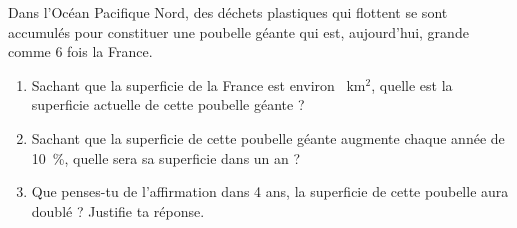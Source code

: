 
\medskip

Dans l'Océan Pacifique Nord, des déchets plastiques qui flottent se sont accumulés pour constituer une poubelle géante qui est, aujourd'hui, grande comme 6 fois la France.

\medskip
 
\begin{enumerate}
\item Sachant que la superficie de la France est environ ~km$^2$, quelle est la superficie actuelle de cette poubelle géante ? 
\item Sachant que la superficie de cette poubelle géante augmente chaque année de 10 \,\%, quelle sera sa superficie dans un an ? 
\item Que penses-tu de l'affirmation \og dans 4 ans, la superficie de cette poubelle aura doublé \fg{} ? Justifie ta réponse.
\end{enumerate}
 
\bigskip

